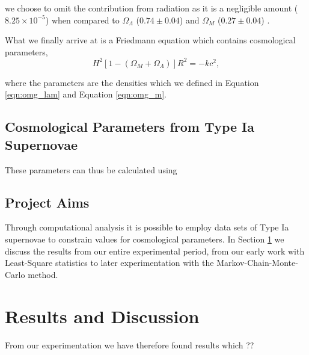 \documentclass[twocolumn]{revtex4}
\begin{document}
we choose to omit the contribution from radiation as it is a negligible amount ($8.25 \times 10^{-5}$) when compared to $\Omega_{\Lambda}$ ($0.74 \pm 0.04$) and $\Omega_{M}$ ($0.27 \pm 0.04$) \cite{mod_ast}. 

What we finally arrive at is a Friedmann equation which contains cosmological parameters, 
\begin{equation}
H^2 [1-(\Omega_{M}+\Omega_{\Lambda})]R^2 = -kc^2,
\end{equation}

where the parameters are the densities which we defined in Equation \ref{eqn:omg_lam} and Equation \ref{eqn:omg_m}. 

\vspace{-3ex}
\subsection{Cosmological Parameters from Type Ia Supernovae}
\vspace{-2ex}
These parameters can thus be calculated using 

\vspace{-3ex}
\subsection{Project Aims}
\vspace{-2ex}

Through computational analysis it is possible to employ data sets of Type Ia supernovae to constrain values for cosmological parameters. In Section \ref{sec:results_discussion} we discuss the results from our entire experimental period, from our early work with Least-Square statistics to later experimentation with the Markov-Chain-Monte-Carlo method. 

\vspace{-3ex}
\section{Results and Discussion} 
\label{sec:results_discussion}
\vspace{-2ex}
From our experimentation we have therefore found results which ??
\end{document}
